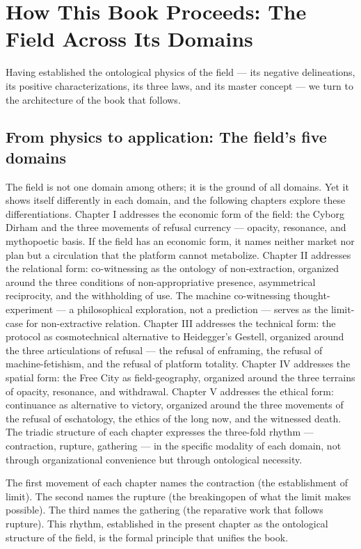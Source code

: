 \section{How This Book Proceeds: The Field Across Its Domains}

Having established the ontological physics of the field — its negative delineations, its positive characterizations, its three laws, and its master concept — we turn to the architecture of the book that follows.

\subsection{From physics to application: The field's five domains}

The field is not one domain among others; it is the ground of all domains. Yet it shows itself differently in each domain, and the following chapters explore these differentiations. Chapter I addresses the economic form of the field: the Cyborg Dirham and the three movements of refusal currency — opacity, resonance, and mythopoetic basis. If the field has an economic form, it names neither market nor plan but a circulation that the platform cannot metabolize. Chapter II addresses the relational form: co-witnessing as the ontology of non-extraction, organized around the three conditions of non-appropriative presence, asymmetrical reciprocity, and the withholding of use. The machine co-witnessing thought-experiment — a philosophical exploration, not a prediction — serves as the limit-case for non-extractive relation. Chapter III addresses the technical form: the   protocol as cosmotechnical alternative to Heidegger's Gestell, organized around the three articulations of refusal — the refusal of enframing, the refusal of machine-fetishism, and the refusal of platform totality. Chapter IV addresses the spatial form: the Free City as field-geography, organized around the three terrains of opacity, resonance, and withdrawal. Chapter V addresses the ethical form: continuance as alternative to victory, organized around the three movements of the refusal of eschatology, the ethics of the long now, and the witnessed death. The triadic structure of each chapter expresses the three-fold rhythm — contraction, rupture, gathering — in the specific modality of each domain, not through organizational convenience but through ontological necessity.

The first movement of each chapter names the contraction (the establishment of limit). The second names the rupture (the breakingopen of what the limit makes possible). The third names the gathering (the reparative work that follows rupture). This rhythm, established in the present chapter as the ontological structure of the field, is the formal principle that unifies the book.

